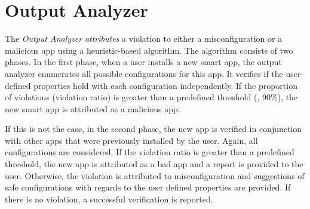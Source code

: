 \chapter{Output Analyzer}
\label{outputanalyzer}

The \textit{Output Analyzer} {\em attributes} a violation to either a misconfiguration or a malicious app
using a heuristic-based algorithm.
The algorithm consists of two phases.
In the first phase, when a user installs a new smart app,
the output analyzer enumerates all possible configurations for this app.
It verifies if the user-defined properties hold with each configuration independently.
If the proportion of violations (violation ratio) is greater than a predefined threshold (\eg, 90\%),
the new smart app is attributed as a malicious app.

If this is not the case, in the second phase, the new app is verified
in conjunction with other apps that were previously installed by the user.
Again, all configurations are considered.
If the violation ratio is greater than a predefined threshold,
the new app is attributed as a bad app and a report is provided to the user.
Otherwise, the violation is attributed to misconfiguration and
suggestions of safe configurations with regards to the user defined properties
are provided.
If there is no violation, a successful verification is reported.


